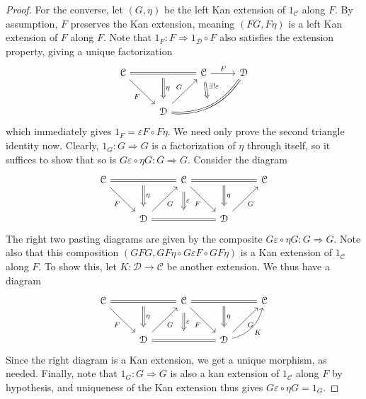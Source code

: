 \begin{proof}
	For the converse, let $(G,\eta)$ be the left Kan extension of $1_\mathcal{C} $ along $F$. By assumption, $F$ preserves the Kan extension, meaning $(FG,F\eta)$ is a left Kan extension of $F$ along $F$. Note that $1_F : F \Rightarrow 1_\mathcal{D} \circ F$ also satisfies the extension property, giving a unique factorization
	\[\begin{tikzcd}[row sep = 2.5em, column sep = 2.5em]
		\mathcal{C} \ar[equals, rr, ""{name=eq1}] \ar[" F "', dr]  &  & \mathcal{C} \ar[" F ", r]  & \mathcal{D}  \\
									   & \mathcal{D} \ar[" G ", ur] \ar[equals, bend right, urr, ""{name=eq2}]  &  & 
									   \arrow[from=eq1, to=2-2, Rightarrow, " \eta ", shorten=5pt] \arrow[from=1-3, to=eq2, Rightarrow, " \exists ! \varepsilon  ", shorten=3pt] 
	\end{tikzcd}\]
	which immediately gives $1_F = \varepsilon F \circ F\eta$. We need only prove the second triangle identity now. Clearly, $1_G : G \Rightarrow G$ is a factorization of $\eta$ through itself, so it suffices to show that so is $G\varepsilon \circ \eta G : G \Rightarrow G$. Consider the diagram
	\[\begin{tikzcd}[row sep = 2.5em, column sep = 2.5em]
		\mathcal{C} \ar[equals, rr, ""{name=eq1}] \ar[" F "', dr]  &  & \mathcal{C} \ar[equals, rr, ""{name=eq3}] \ar[" F "', dr]  &  & \mathcal{C}  \\
									   & \mathcal{D} \ar[" G "', ur] \ar[equals, rr, ""{name=eq2}]  &  & \mathcal{D} \ar[" G "', ur]  & 
									   \arrow[from=eq1, to=2-2, " \eta ", Rightarrow, shorten=5pt] \arrow[from=1-3, to=eq2, Rightarrow, " \varepsilon  ", shorten=5pt] \arrow[from=eq3, to=2-4, Rightarrow, " \eta ", shorten=5pt] 
	\end{tikzcd}\]
	The right two pasting diagrams are given by the composite $G\varepsilon \circ \eta G : G \Rightarrow G$. Note also that this composition $(GFG,GF\eta \circ G\varepsilon F \circ GF\eta)$ is a Kan extension of $1_\mathcal{C} $ along $F$. To show this, let $K : \mathcal{D}  \to \mathcal{C} $ be another extension. We thus have a diagram
	\[\begin{tikzcd}[row sep = 2.5em, column sep = 2.5em]
		\mathcal{C} \ar[equals, rr, ""{name=eq1}] \ar[" F "', dr]  &  & \mathcal{C} \ar[equals, rr, ""{name=eq3}] \ar[" F "', dr]  &  & \mathcal{C}  \\
									   & \mathcal{D} \ar[" G "', ur] \ar[equals, rr, ""{name=eq2}]  &  & \mathcal{D} \ar[" G "', ur] \ar[" K "', bend right, ur]  & 
									   \arrow[from=eq1, to=2-2, " \eta ", Rightarrow, shorten=5pt] \arrow[from=1-3, to=eq2, Rightarrow, " \varepsilon  ", shorten=5pt] \arrow[from=eq3, to=2-4, Rightarrow, " \eta ", shorten=5pt] 
	\end{tikzcd}\]
	Since the right diagram is a Kan extension, we get a unique morphism, as needed. Finally, note that $1_G : G \Rightarrow G$ is also a kan extension of $1_\mathcal{C} $ along $F$ by hypothesis, and uniqueness of the Kan extension thus gives $G\varepsilon \circ \eta G =1_G$.
\end{proof}

